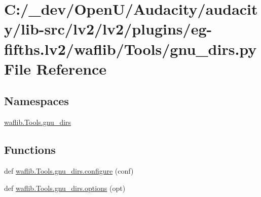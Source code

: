\hypertarget{lv2_2plugins_2eg-fifths_8lv2_2waflib_2_tools_2gnu__dirs_8py}{}\section{C\+:/\+\_\+dev/\+Open\+U/\+Audacity/audacity/lib-\/src/lv2/lv2/plugins/eg-\/fifths.lv2/waflib/\+Tools/gnu\+\_\+dirs.py File Reference}
\label{lv2_2plugins_2eg-fifths_8lv2_2waflib_2_tools_2gnu__dirs_8py}
\subsection*{Namespaces}
\begin{DoxyCompactItemize}
\item 
 \hyperlink{namespacewaflib_1_1_tools_1_1gnu__dirs}{waflib.\+Tools.\+gnu\+\_\+dirs}
\end{DoxyCompactItemize}
\subsection*{Functions}
\begin{DoxyCompactItemize}
\item 
def \hyperlink{namespacewaflib_1_1_tools_1_1gnu__dirs_a03d9dce5a06f4f739652667447f57eb9}{waflib.\+Tools.\+gnu\+\_\+dirs.\+configure} (conf)
\item 
def \hyperlink{namespacewaflib_1_1_tools_1_1gnu__dirs_ad291b2ee61d479ae1005acd11eaf6ead}{waflib.\+Tools.\+gnu\+\_\+dirs.\+options} (opt)
\end{DoxyCompactItemize}
